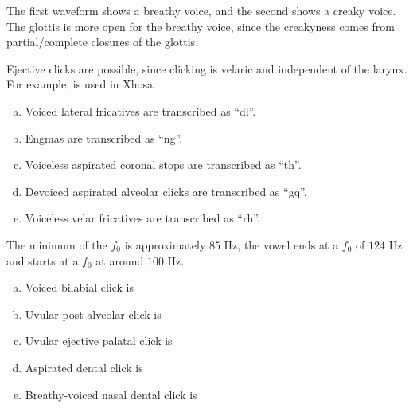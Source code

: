 \documentclass{../../templates/lkx_pset}
\begin{document}
\begin{problem}{6}
\end{problem}
\begin{solution}
	The first waveform shows a breathy voice, and the second shows a creaky voice. The glottis is more open for the breathy voice, since the creakyness comes from partial/complete closures of the glottis.
\end{solution}

\begin{problem}{7}
\end{problem}

\begin{solution}
	Ejective clicks are possible, since clicking is velaric and independent of the larynx. For example, \textipa{[k!']} is used in Xhosa.
\end{solution}

\begin{problem}{8}
\end{problem}

\begin{enumerate}[(a)]
	\item Voiced lateral fricatives are transcribed as ``dl''.
	\item Engmas are transcribed as ``ng''.
	\item Voiceless aspirated coronal stops are transcribed as ``th''.
	\item Devoiced aspirated alveolar clicks are transcribed as ``gq''.
	\item Voiceless velar fricatives are transcribed as ``rh''.
\end{enumerate}

\begin{problem}{9}
\end{problem}

\begin{solution}
  The minimum of the $f_0$ is approximately $85$ Hz, the vowel ends at a $f_0$ of $124$ Hz and starts at a $f_0$ at around $100$ Hz.
\end{solution}

\begin{problem}{10}
\end{problem}

\begin{enumerate}[(a)]
	\item Voiced bilabial click is \textipa{[g\!o]}
	\item Uvular post-alveolar click is \textipa{[q!]}
	\item Uvular ejective palatal click is \textipa{[q\textdoublebarpipe']}
	\item Aspirated dental click is \textipa{[k|\super{h}]}
	\item Breathy-voiced nasal dental click is \textipa{[\"N|]}
\end{enumerate}
\end{document}
